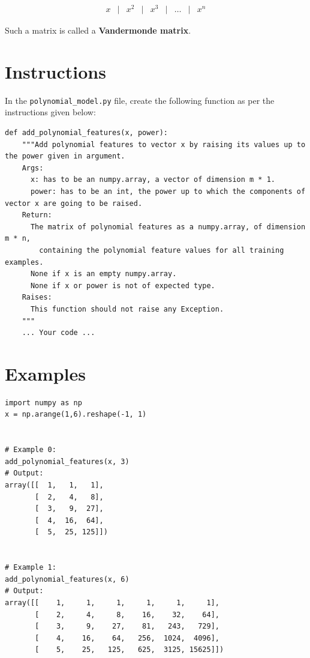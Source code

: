 \documentclass{42-en}
\begin{document}
$$
\begin{matrix}
x &|& x^2 &|& x^3 &|& \ldots &|& x^n
\end{matrix}
$$

Such a matrix is called a \textbf{Vandermonde matrix}.

\section*{Instructions}
In the \texttt{polynomial\_model.py} file, create the following function as per the instructions given below:

\begin{verbatim}
def add_polynomial_features(x, power):
    """Add polynomial features to vector x by raising its values up to the power given in argument.  
    Args:
      x: has to be an numpy.array, a vector of dimension m * 1.
      power: has to be an int, the power up to which the components of vector x are going to be raised.
    Return:
      The matrix of polynomial features as a numpy.array, of dimension m * n,
        containing the polynomial feature values for all training examples.
      None if x is an empty numpy.array.
      None if x or power is not of expected type.
    Raises:
      This function should not raise any Exception.
    """
    ... Your code ...
\end{verbatim}

\section*{Examples}
\begin{verbatim}
import numpy as np
x = np.arange(1,6).reshape(-1, 1)


# Example 0:
add_polynomial_features(x, 3)
# Output:
array([[  1,   1,   1],
       [  2,   4,   8],
       [  3,   9,  27],
       [  4,  16,  64],
       [  5,  25, 125]])


# Example 1:
add_polynomial_features(x, 6)
# Output:
array([[    1,     1,     1,     1,     1,     1],
       [    2,     4,     8,    16,    32,    64],
       [    3,     9,    27,    81,   243,   729],
       [    4,    16,    64,   256,  1024,  4096],
       [    5,    25,   125,   625,  3125, 15625]])
\end{verbatim}
\end{document}
